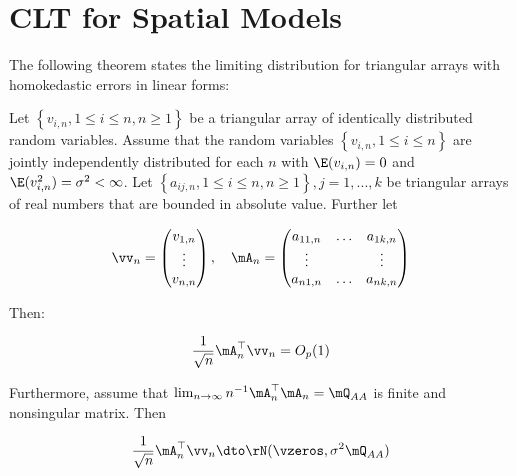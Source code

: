 \section{CLT for Spatial Models}


The following theorem states the limiting distribution for triangular arrays with homokedastic errors in linear forms:

\begin{theorem}\label{teo:CLT_tri_arr}
Let $\left\lbrace v_{i,n}, 1 \leq i \leq n, n\geq 1\right\rbrace $ be a triangular array of identically distributed random variables. Assume that the random variables $\left\lbrace v_{i,n}, 1 \leq i \leq n\right\rbrace$ are jointly independently distributed for each $n$ with $\E(v_{i,n})= 0$ and $\E(v_{i,n}^2) = \sigma^2 < \infty$. Let $\left\lbrace a_{ij,n}, 1 \leq i \leq n, n\geq 1\right\rbrace, j = 1,...,k$ be triangular arrays of real numbers that are bounded in absolute value. Further let

\begin{equation*}
  \vv_n = \begin{pmatrix}
            v_{1, n} \\
            \vdots \\
            v_{n,n}
          \end{pmatrix}, \quad
          \mA_n = \begin{pmatrix}
            a_{11,n} & \hdots & a_{1k, n} \\
            \vdots &         & \vdots \\
            a_{n1,n} & \hdots & a_{nk, n}
          \end{pmatrix}
\end{equation*}

Then:

\begin{equation*}
\frac{1}{\sqrt{n}}\mA_n^\top\vv_n = O_p(1)
\end{equation*}

Furthermore, assume that $\lim_{n\to\infty}n^{-1}\mA^\top_n\mA_n = \mQ_{AA}$ is finite and nonsingular matrix. Then

\begin{equation*}
\frac{1}{\sqrt{n}}\mA_n^\top\vv_n \dto \rN(\vzeros, \sigma^2 \mQ_{AA})
\end{equation*}
\end{theorem}


